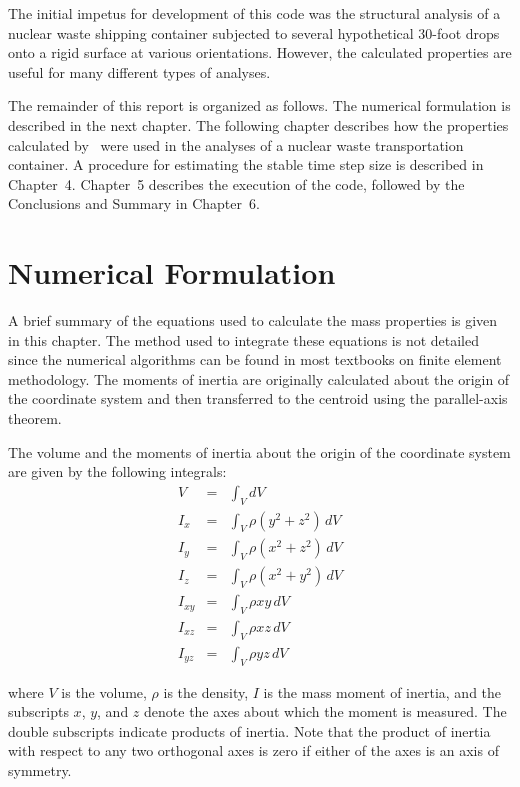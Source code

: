 The initial impetus for development of this code was the structural
analysis of a nuclear waste shipping container subjected to several
hypothetical 30-foot drops onto a rigid surface at various
orientations.  However, the calculated properties are useful for many
different types of analyses. 

The remainder of this report is organized as follows.  The numerical
formulation is described in the next chapter.  The following chapter
describes how the properties calculated by \NUM\ were used in the
analyses of a nuclear waste transportation container.  A procedure for
estimating the stable time step size is described in Chapter~4.
Chapter~5 describes the execution of the code, followed by the
Conclusions and Summary in Chapter~6. 


% 
%

\chapter{Numerical Formulation} A brief summary of the equations used
to calculate the mass properties is given in this chapter. The method
used to integrate these equations is not detailed since the numerical
algorithms can be found in most textbooks on finite element
methodology.  The moments of inertia are originally calculated about
the origin of the coordinate system and then transferred to the
centroid using the parallel-axis theorem. 

The volume and the moments of inertia about the origin of the
coordinate system are given by the following integrals: 
\begin{eqnarray}
 V      &=& \int_V dV                             \\
 I_x    &=& \int_V \rho\left(y^2 + z^2\right)\,dV \\
 I_y    &=& \int_V \rho\left(x^2 + z^2\right)\,dV \\
 I_z    &=& \int_V \rho\left(x^2 + y^2\right)\,dV \\
 I_{xy} &=& \int_V \rho xy\,dV                    \\
 I_{xz} &=& \int_V \rho xz\,dV                    \\
 I_{yz} &=& \int_V \rho yz\,dV                    
\end{eqnarray}

where $V$ is the volume, $\rho$ is the density, $I$ is the mass moment
of inertia, and the subscripts $x$, $y$, and $z$ denote the axes about
which the moment is measured.  The double subscripts indicate products
of inertia.  Note that the product of inertia with respect to any two
orthogonal axes is zero if either of the axes is an axis of symmetry. 

